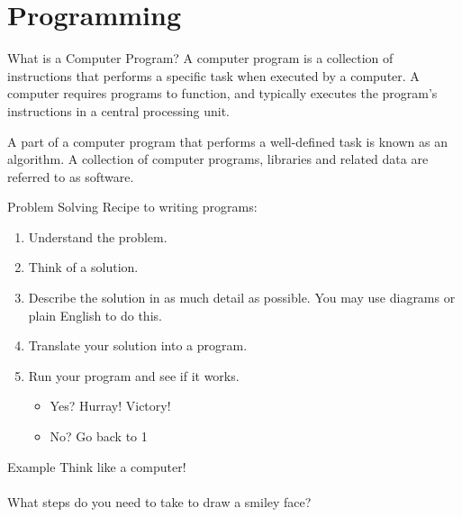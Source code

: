 \documentclass[../lecture1-introduction.tex]{subfiles}
\begin{document}
\section{Programming}


\begin{frame}[fragile]{What is a Computer Program?}
    A computer program is a collection of instructions that performs a specific
    task when executed by a computer. A computer requires programs to function,
    and typically executes the program's instructions in a central processing unit.

    A part of a computer program that performs a well-defined task is known as
    an algorithm. A collection of computer programs, libraries and related data
    are referred to as software.
\end{frame}


\begin{frame}[fragile]{Problem Solving}
    Recipe to writing programs:
    \begin{enumerate}
        \item Understand the problem.
        \item Think of a solution.
        \item Describe the solution in as much detail as possible. \newline
              You may use diagrams or plain English to do this.
        \item Translate your solution into a program.
        \item Run your program and see if it works.
        \begin{itemize}
            \item Yes? Hurray! Victory!
            \item No? Go back to 1
        \end{itemize}
    \end{enumerate}
\end{frame}


\begin{frame}[fragile]{Example}
    Think like a computer! \\~\\

    What steps do you need to take to draw a smiley face?
\end{frame}
\end{document}
